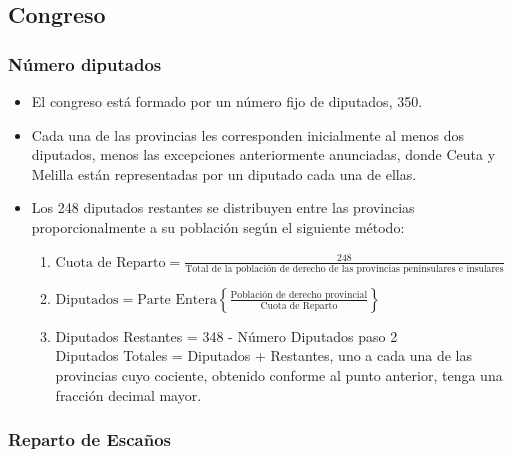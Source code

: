 \documentclass[12pt,a4paper,]{book}
\numberwithin{dummy}{section}
\theoremstyle{ocrenumbox}
\theoremstyle{blacknumex}
\theoremstyle{blacknumbox}
\theoremstyle{ocrenum}
\theoremstyle{ocrenum}
\begin{document}
\hypertarget{congreso}{%
\subsection{Congreso}\label{congreso}}

\hypertarget{nuxfamero-diputados}{%
\subsubsection{Número diputados}\label{nuxfamero-diputados}}

\begin{itemize}
\item
  El congreso está formado por un número fijo de diputados, 350.
\item
  Cada una de las provincias les corresponden inicialmente al menos dos
  diputados, menos las excepciones anteriormente anunciadas, donde Ceuta
  y Melilla están representadas por un diputado cada una de ellas.
\item
  Los 248 diputados restantes se distribuyen entre las provincias
  proporcionalmente a su población según el siguiente método:

  \begin{enumerate}
  \def\labelenumi{\arabic{enumi}.}
  \item
    \(\textrm{Cuota de Reparto} = \frac{248}{\text{Total de la poblaci\'{o}n de derecho de las provincias peninsulares e insulares}}\)
  \item
    \(\textrm{Diputados} = \text{Parte Entera} \left\{\frac{\text{Población de derecho provincial}}{\text{Cuota de Reparto}}\right\}\)
  \item
    Diputados Restantes = 348 - Número Diputados paso 2\\
    Diputados Totales = Diputados + Restantes, uno a cada una de las
    provincias cuyo cociente, obtenido conforme al punto anterior, tenga
    una fracción decimal mayor.
  \end{enumerate}
\end{itemize}

\hypertarget{reparto-de-escauxf1os}{%
\subsubsection{Reparto de Escaños}\label{reparto-de-escauxf1os}}
\end{document}
